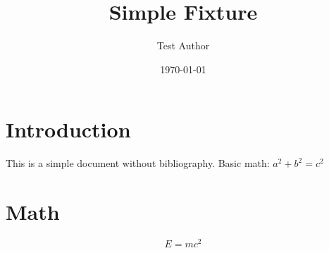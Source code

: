 \documentclass{article}
\title{Simple Fixture}
\author{Test Author}
\date{\today}
\begin{document}
\maketitle

\section{Introduction}
This is a simple document without bibliography. Basic math: $a^2 + b^2 = c^2$

\section{Math}
\begin{equation}
    E = mc^2
\end{equation}
\end{document}
